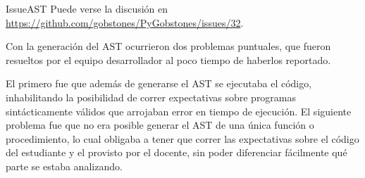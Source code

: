 \sepfootnotecontent
  {IssueAST}
  {Puede verse la discusión en \url{https://github.com/gobstones/PyGobstones/issues/32}.}

Con la generación del AST ocurrieron dos problemas puntuales, que fueron resueltos por el equipo desarrollador al poco tiempo de haberlos reportado.

El primero fue que además de generarse el AST se ejecutaba el código, inhabilitando la posibilidad de correr expectativas sobre programas sintácticamente válidos que arrojaban error en tiempo de ejecución. El siguiente problema fue que no era posible generar el AST de una única función o procedimiento, lo cual obligaba a tener que correr las expectativas sobre el código del estudiante y el provisto por el docente, sin poder diferenciar fácilmente qué parte se estaba analizando.
